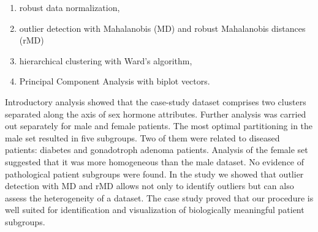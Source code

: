 \documentclass[\main/boa.tex]{subfiles}
\begin{document}
\begin{enumerate}
\def\labelenumi{\arabic{enumi}.}
\tightlist
\item
  robust data normalization,
\item
  outlier detection with Mahalanobis (MD) and robust Mahalanobis
  distances (rMD)
\item
  hierarchical clustering with Ward's algorithm,
\item
  Principal Component Analysis with biplot vectors.
\end{enumerate}

Introductory analysis showed that the case-study dataset comprises two
clusters separated along the axis of sex hormone attributes. Further
analysis was carried out separately for male and female patients. The
most optimal partitioning in the male set resulted in five subgroups.
Two of them were related to diseased patients: diabetes and gonadotroph
adenoma patients. Analysis of the female set suggested that it was more
homogeneous than the male dataset. No evidence of pathological patient
subgroups were found. In the study we showed that outlier detection with
MD and rMD allows not only to identify outliers but can also assess the
heterogeneity of a dataset. The case study proved that our procedure is
well suited for identification and visualization of biologically
meaningful patient subgroups.
\end{document}
